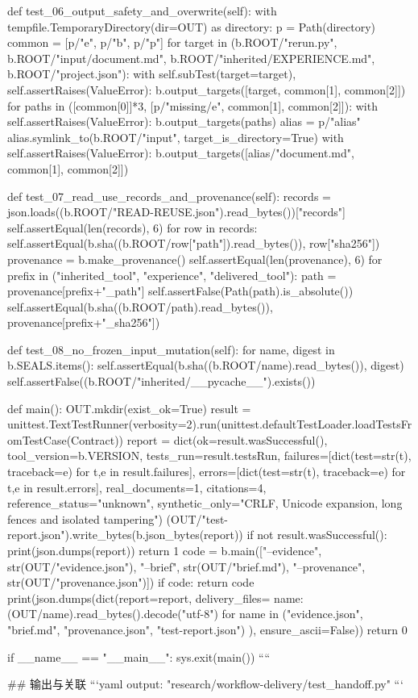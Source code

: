     def test_06_output_safety_and_overwrite(self):
        with tempfile.TemporaryDirectory(dir=OUT) as directory:
            p = Path(directory)
            common = [p/"e", p/"b", p/"p"]
            for target in (b.ROOT/"rerun.py", b.ROOT/"input/document.md",
                           b.ROOT/"inherited/EXPERIENCE.md", b.ROOT/"project.json"):
                with self.subTest(target=target), self.assertRaises(ValueError):
                    b.output_targets([target, common[1], common[2]])
            for paths in ([common[0]]*3, [p/"missing/e", common[1], common[2]]):
                with self.assertRaises(ValueError):
                    b.output_targets(paths)
            alias = p/"alias"
            alias.symlink_to(b.ROOT/"input", target_is_directory=True)
            with self.assertRaises(ValueError):
                b.output_targets([alias/"document.md", common[1], common[2]])

    def test_07_read_use_records_and_provenance(self):
        records = json.loads((b.ROOT/"READ-REUSE.json").read_bytes())["records"]
        self.assertEqual(len(records), 6)
        for row in records:
            self.assertEqual(b.sha((b.ROOT/row["path"]).read_bytes()), row["sha256"])
        provenance = b.make_provenance()
        self.assertEqual(len(provenance), 6)
        for prefix in ("inherited_tool", "experience", "delivered_tool"):
            path = provenance[prefix+"_path"]
            self.assertFalse(Path(path).is_absolute())
            self.assertEqual(b.sha((b.ROOT/path).read_bytes()), provenance[prefix+"_sha256"])

    def test_08_no_frozen_input_mutation(self):
        for name, digest in b.SEALS.items():
            self.assertEqual(b.sha((b.ROOT/name).read_bytes()), digest)
        self.assertFalse((b.ROOT/"inherited/__pycache__").exists())

def main():
    OUT.mkdir(exist_ok=True)
    result = unittest.TextTestRunner(verbosity=2).run(unittest.defaultTestLoader.loadTestsFromTestCase(Contract))
    report = dict(ok=result.wasSuccessful(), tool_version=b.VERSION, tests_run=result.testsRun,
                  failures=[dict(test=str(t), traceback=e) for t,e in result.failures],
                  errors=[dict(test=str(t), traceback=e) for t,e in result.errors],
                  real_documents=1, citations=4, reference_status="unknown",
                  synthetic_only="CRLF, Unicode expansion, long fences and isolated tampering")
    (OUT/"test-report.json").write_bytes(b.json_bytes(report))
    if not result.wasSuccessful():
        print(json.dumps(report))
        return 1
    code = b.main(["--evidence", str(OUT/"evidence.json"), "--brief", str(OUT/"brief.md"),
                   "--provenance", str(OUT/"provenance.json")])
    if code:
        return code
    print(json.dumps(dict(report=report, delivery_files={
        name:(OUT/name).read_bytes().decode("utf-8")
        for name in ("evidence.json", "brief.md", "provenance.json", "test-report.json")
    }), ensure_ascii=False))
    return 0

if __name__ == "__main__":
    sys.exit(main())
````

## 输出与关联
```yaml
output: "research/workflow-delivery/test_handoff.py"
```

